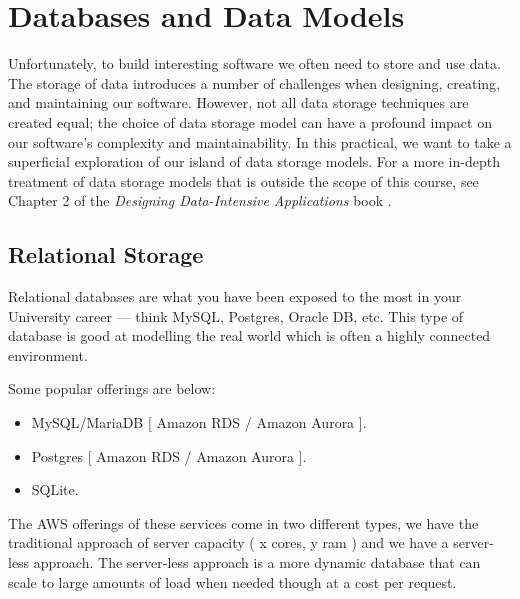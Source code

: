 \documentclass{csse4400}
\begin{document}
\section{Databases and Data Models}
Unfortunately, to build interesting software we often need to store and use data.
The storage of data introduces a number of challenges when designing, creating, and maintaining our software.
However, not all data storage techniques are created equal;
the choice of data storage model can have a profound impact on our software's complexity and maintainability.
In this practical, we want to take a superficial exploration of our island of data storage models.
For a more in-depth treatment of data storage models that is outside the scope of this course,
see Chapter 2 of the \textit{Designing Data-Intensive Applications} book \cite{data-intensive}.



\subsection{Relational Storage}

Relational databases are what you have been exposed to the most in your University career --- think MySQL, Postgres, Oracle DB, etc.
This type of database is good at modelling the real world which is often a highly connected environment.

Some popular offerings are below:

\begin{itemize}
  \item MySQL/MariaDB [ Amazon RDS / Amazon Aurora ].
  \item Postgres [ Amazon RDS / Amazon Aurora ].
  \item SQLite.
\end{itemize}

The AWS offerings of these services come in two different types, we have the traditional approach of
server capacity ( x cores, y ram ) and we have a server-less approach.
The server-less approach is a more dynamic
database that can scale to large amounts of load when needed though at a cost per request.
\end{document}
